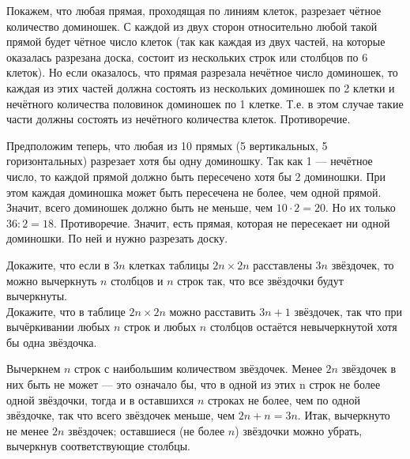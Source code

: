 \documentclass[12pt,a4paper]{article}
\begin{document}
 Покажем, что любая прямая, проходящая по линиям клеток, разрезает чётное количество доминошек. С каждой из двух сторон относительно любой такой прямой будет чётное число клеток (так как каждая из двух частей, на которые оказалась разрезана доска, состоит из нескольких строк или столбцов по 6 клеток). Но если оказалось, что прямая разрезала нечётное число доминошек, то каждая из этих частей должна состоять из нескольких доминошек по 2 клетки и нечётного количества половинок доминошек по 1 клетке. Т.е. в этом случае такие части должны состоять из нечётного количества клеток. Противоречие.

Предположим теперь, что любая из 10 прямых (5 вертикальных, 5 горизонтальных) разрезает хотя бы одну доминошку. Так как 1 --- нечётное число, то каждой прямой должно быть пересечено хотя бы 2 доминошки. При этом каждая доминошка может быть пересечена не более, чем одной прямой. Значит, всего доминошек должно быть не меньше, чем $10·2=20$. Но их только $36:2=18$. Противоречие. Значит, есть прямая, которая не пересекает ни одной доминошки. По ней и нужно разрезать доску.

 Докажите, что если в $3n$ клетках таблицы $2n\times 2n$ расставлены $3n$ звёздочек, то можно вычеркнуть $n$ столбцов и $n$ строк
так, что все звёздочки будут вычеркнуты.\\
 Докажите, что в таблице $2n\times2n$ можно расставить $3n+1$ звёздочек, так что при вычёркивании любых $n$ строк и любых $n$ столбцов остаётся невычеркнутой хотя бы одна звёздочка.

    Вычеркнем $n$ строк с наибольшим количеством звёздочек. Менее $2n$ звёздочек в них быть не может --- это означало бы, что в одной из этих n строк не более одной звёздочки, тогда и в оставшихся $n$ строках не более, чем по одной звёздочке, так что всего звёздочек меньше, чем  $2n + n = 3n$.  Итак, вычеркнуто не менее $2n$ звёздочек; оставшиеся (не более $n$) звёздочки можно убрать, вычеркнув соответствующие столбцы.


\end{document}
